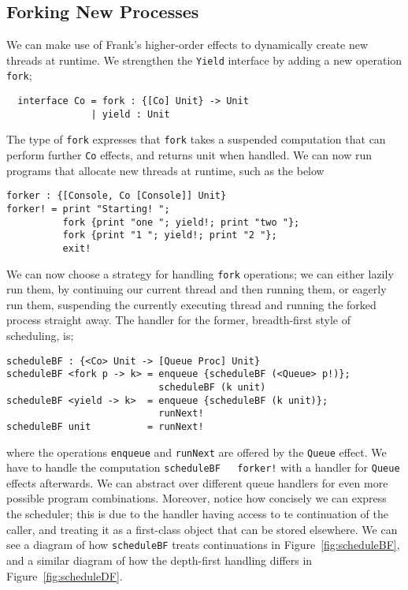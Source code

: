 \documentclass[msc,deptreport,cs]{infthesis} %
\newcommand{\code}[1]{\lstinline{#1}}
\begin{document}
\subsection{Forking New Processes}
\label{subsec:forking-new-processes}

We can make use of Frank's higher-order effects to dynamically create new
threads at runtime. We strengthen the \code{Yield} interface by adding a new
operation \code{fork};

\begin{lstlisting}
  interface Co = fork : {[Co] Unit} -> Unit
               | yield : Unit
\end{lstlisting}

The type of \code{fork} expresses that \code{fork} takes a suspended computation
that can perform further \code{Co} effects, and returns unit when handled. We
can now run programs that allocate new threads at runtime, such as the below

\begin{lstlisting}
forker : {[Console, Co [Console]] Unit}
forker! = print "Starting! ";
          fork {print "one "; yield!; print "two "};
          fork {print "1 "; yield!; print "2 "};
          exit!
\end{lstlisting}

We can now choose a strategy for handling \code{fork} operations; we can either
lazily run them, by continuing our current thread and then running them, or
eagerly run them, suspending the currently executing thread and running the
forked process straight away. The handler for the former, breadth-first style of
scheduling, is;

\begin{lstlisting}
scheduleBF : {<Co> Unit -> [Queue Proc] Unit}
scheduleBF <fork p -> k> = enqueue {scheduleBF (<Queue> p!)};
                           scheduleBF (k unit)
scheduleBF <yield -> k>  = enqueue {scheduleBF (k unit)};
                           runNext!
scheduleBF unit          = runNext!
\end{lstlisting}

\noindent where the operations \code{enqueue} and \code{runNext} are offered by
the \code{Queue} effect. We have to handle the computation \code{scheduleBF
  forker!} with a handler for \code{Queue} effects afterwards. We can abstract
over different queue handlers for even more possible program combinations.
Moreover, notice how concisely we can express the scheduler; this is due to the
handler having access to te continuation of the caller, and treating it as a
first-class object that can be stored elsewhere. We can see a diagram of how
\code{scheduleBF} treats continuations in Figure~\ref{fig:scheduleBF}, and a
similar diagram of how the depth-first handling differs in
Figure~\ref{fig:scheduleDF}.
\end{document}
